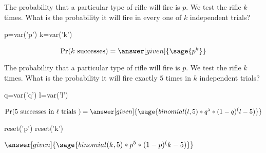 \documentclass{ximera}
\begin{document}
\hspace{1cm}

\begin{problem}
The probability that a particular type of rifle will fire is $p$. We test the rifle $k$ times.
What is the probability it will fire in every one of $k$ independent trials? 

\begin{explanation}
\begin{sagesilent}
p=var('p')
k=var('k')
\end{sagesilent}
\begin{equation*} 
\Pr(k \text{ successes} ) = \answer[given]{\sage{p^k}}
\end{equation*}

\end{explanation}
\end{problem}


\begin{problem}
The probability that a particular type of rifle will fire is $p$. We test the rifle $k$ times.
What is the probability it will fire exactly $5$ times in $k$ independent trials? 

\begin{explanation}
\begin{sagesilent}
q=var('q')
l=var('l')
\end{sagesilent}
\begin{equation*} 
\Pr(5 \text{ successes in  } \ell \text{ trials } ) = \answer[given]{\sage{binomial(l,5)*q^5*(1-q)^(l-5)}} 
\end{equation*}
\end{explanation}
\end{problem}

\begin{problem}
\begin{sagesilent}
reset('p')
reset('k')
\end{sagesilent}
\begin{prompt}
$\answer[given]{\sage{binomial(k,5)*p^5*(1-p)^(k-5)}}$
\end{prompt}
\end{problem}
\end{document}
